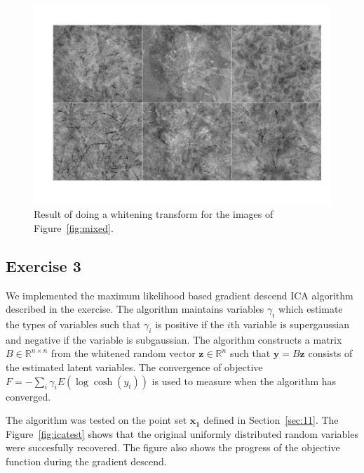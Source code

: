 \documentclass{article}
\renewcommand\vec[1]{\ensuremath{\mathbf{#1}}}
\begin{document}
\begin{figure}\centering
	\includegraphics[scale=\iscale]{white}
	\caption{Result of doing a whitening transform for the images of Figure~\ref{fig:mixed}.}\label{fig:white}
\end{figure}

\subsection{Exercise 3}
We implemented the maximum likelihood based gradient descend ICA algorithm described in the exercise.
The algorithm maintains variables $\gamma_i$ which estimate the types of variables such that $\gamma_i$ is positive if the $i$th variable is supergaussian and negative if the variable is subgaussian.
The algorithm constructs a matrix $B\in\mathbb{R}^{n\times n}$ from the whitened random vector $\vec z\in\mathbb{R}^n$ such that $\vec y=B\vec z$ consists of the estimated latent variables.
The convergence of objective $F=-\sum_i\gamma_iE(\log\cosh(y_i))$ is used to measure when the algorithm has converged.

The algorithm was tested on the point set \vec{x_1} defined in Section~\ref{sec:11}.
The Figure~\ref{fig:icatest} shows that the original uniformly distributed random variables were succesfully recovered.
The figure also shows the progress of the objective function during the gradient descend.
\end{document}
